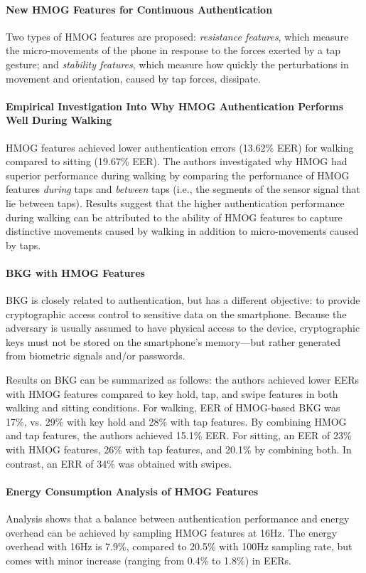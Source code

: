 \documentclass{article}
\begin{document}
\paragraph{New HMOG Features for Continuous Authentication} 
Two types of HMOG features are proposed: {\em resistance features}, which measure the micro-movements of the phone in response to the forces exerted by a tap gesture; and {\em stability features}, which measure how quickly the perturbations in movement and orientation, caused by tap forces, dissipate. %

\paragraph{Empirical Investigation Into Why HMOG Authentication Performs Well During Walking}  HMOG features achieved lower authentication errors (13.62\% EER) for walking compared to sitting (19.67\% EER). The authors investigated why HMOG had superior performance during walking by comparing the performance of HMOG features {\em during} taps and {\em between} taps (i.e., the segments of the sensor signal that lie between taps). Results suggest that the higher authentication performance %
during walking can be attributed to the ability of HMOG features to capture distinctive 
%
movements caused by walking in addition to micro-movements caused by taps. %

\paragraph{BKG with HMOG Features} 
%
BKG is closely related to authentication, but has a different objective: to 
provide cryptographic access control to sensitive data on the smartphone. Because the adversary is usually assumed to have physical access to the device, cryptographic keys must not be stored on the smartphone's memory---but rather generated from biometric signals and/or passwords.

Results on BKG can be summarized as follows: the authors achieved lower EERs with HMOG features compared to key hold, tap, and swipe features in both walking and sitting conditions. For walking, EER of HMOG-based BKG was 17\%, vs. 29\% with key hold and 28\% with tap features. By combining HMOG and tap features, the authors achieved 15.1\% EER. For sitting, an EER of 23\% with HMOG features, 26\% with tap features, and 20.1\% by combining both. In contrast, an ERR of 34\% was obtained with swipes.

\paragraph{Energy Consumption Analysis of HMOG Features}
Analysis shows that a balance between authentication performance and energy overhead can be achieved by sampling HMOG features at 16Hz. The energy overhead with 16Hz is 7.9\%, compared to 20.5\% with 100Hz sampling rate, but comes with minor increase (ranging from 0.4\% to 1.8\%) in EERs.
\end{document}
